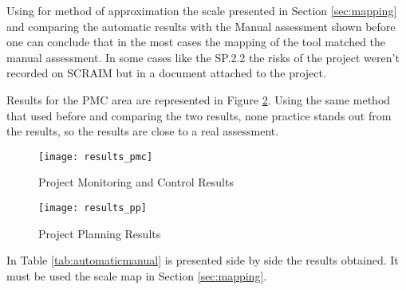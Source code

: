 Using for method of approximation the scale presented in Section \ref{sec:mapping} and comparing the automatic results with the Manual assessment shown before one can conclude that in the most cases the mapping of the tool matched the manual assessment. In some cases like  the SP.2.2 the risks of the project weren't recorded on SCRAIM but in a document attached to the project.


Results for the PMC area are represented in Figure \ref{fig:results_pmc}. Using the same method that used before and comparing the two results, none practice stands out from the results, so the results are close to a real assessment.


\begin{figure}[!htb]
	\begin{center}
		\leavevmode
		\texttt{[image: results\_pmc]}
		\caption{Project Monitoring and Control Results}
		\label{fig:results_pp}
	\end{center}
\end{figure}

\begin{figure}[!htb]
	\begin{center}
		\leavevmode
		\texttt{[image: results\_pp]}
		\caption{Project Planning Results}
		\label{fig:results_pmc}
	\end{center}
\end{figure}

In Table \ref{tab:automaticmanual} is presented side by side the results obtained. It must be used the scale map in Section \ref{sec:mapping}.

